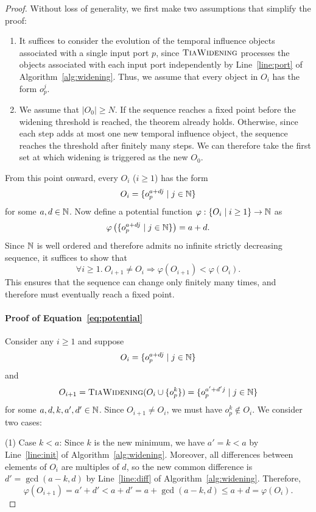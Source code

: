 \begin{proof}
    Without loss of generality, we first make two assumptions that simplify the proof:
    \begin{enumerate}[leftmargin=*]
        \item
        It suffices to consider the evolution of the temporal influence objects associated with a single input port $p$, since $\textsc{TiaWidening}$ processes the objects associated with each input port independently by Line~\ref{line:port} of Algorithm~\ref{alg:widening}.
        Thus, we assume that every object in $O_i$ has the form $o_p^j$.
        \item
        We assume that $|O_0| \geq N$.
        If the sequence reaches a fixed point before the widening threshold is reached, the theorem already holds.
        Otherwise, since each step adds at most one new temporal influence object, the sequence reaches the threshold after finitely many steps.
        We can therefore take the first set at which widening is triggered as the new $O_0$.
    \end{enumerate}
    From this point onward, every $O_i$ ($i \ge 1$) has the form
    \[
    O_i = \{o_p^{a + d j} \mid j \in \mathbb{N}\}
    \]
    for some $a,d \in \mathbb{N}$.
    Now define a potential function $\varphi : \{O_i \mid i \ge 1\} \to \mathbb{N}$ as
    \[
    \varphi\left(\{o_p^{a + dj} \mid j \in \mathbb{N}\}\right) = a + d.
    \]
    Since $\mathbb{N}$ is well ordered and therefore admits no infinite strictly decreasing sequence, it suffices to show that
    \begin{equation}\label{eq:potential}
        \forall i \ge 1.\ O_{i+1} \ne O_{i} \Rightarrow \varphi(O_{i+1}) < \varphi(O_{i}).
    \end{equation}
    This ensures that the sequence can change only finitely many times, and therefore must eventually reach a fixed point.

    \paragraph{Proof of Equation~\eqref{eq:potential}}
    Consider any $i \geq 1$ and suppose
    \[
    O_i = \{o_p^{a + d j} \mid j \in \mathbb{N}\}
    \]
    and
    \[
    O_{i+1} = \textsc{TiaWidening}(O_i \cup \{o_p^k\}) = \{o_p^{a'+d'j}\mid j\in\mathbb{N}\}
    \]
    for some $a,d, k, a', d' \in \mathbb{N}$.
    Since $O_{i+1}\neq O_i$, we must have $o_p^k\notin O_i$.
    We consider two cases:

    \noindent
    (1) Case $k < a$:
    Since $k$ is the new minimum, we have $a' = k < a$ by Line~\ref{line:init} of Algorithm~\ref{alg:widening}.
    Moreover, all differences between elements of $O_i$ are multiples of $d$, so the new common difference is $d' = \gcd(a - k, d)$ by Line~\ref{line:diff} of Algorithm~\ref{alg:widening}.
    Therefore,
    \[
    \varphi(O_{i+1}) = a' + d' < a + d' = a + \gcd(a - k, d) \le a + d = \varphi(O_i).
    \]


\end{proof}
